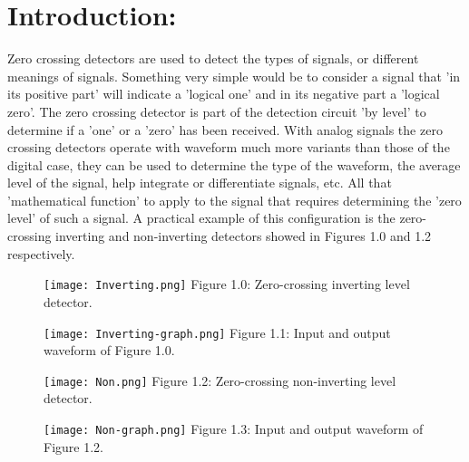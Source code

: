 \section{Introduction:}

Zero crossing detectors are used to detect the types of signals, or different meanings of signals. Something very simple would be to consider a signal that 'in its positive part' will indicate a 'logical one' and in its negative part a 'logical zero'. The zero crossing detector is part of the detection circuit 'by level' to determine if a 'one' or a 'zero' has been received. With analog signals the zero crossing detectors operate with waveform much more variants than those of the digital case, they can be used to determine the type of the waveform, the average level of the signal, help integrate or differentiate signals, etc. All that 'mathematical function' to apply to the signal that requires determining the 'zero level' of such a signal. A practical example of this configuration is the zero-crossing inverting and non-inverting detectors showed in Figures 1.0 and 1.2 respectively. \hfill \break

\begin{multicols}{2}
\begin{figure}[H]
\texttt{[image: Inverting.png]}
\centering \linebreak \linebreak Figure 1.0: Zero-crossing inverting level detector.
\end{figure} \hfill

\begin{figure}[H]
\texttt{[image: Inverting-graph.png]}
\centering \linebreak \linebreak Figure 1.1: Input and output waveform of Figure 1.0.
\end{figure} \hfill
\end{multicols} 

\begin{multicols}{2}
\begin{figure}[H]
\texttt{[image: Non.png]}
\centering \linebreak \linebreak Figure 1.2: Zero-crossing non-inverting level detector.
\end{figure} \hfill

\begin{figure}[H]
\texttt{[image: Non-graph.png]}
\centering \linebreak \linebreak Figure 1.3: Input and output waveform of Figure 1.2.
\end{figure} \hfill
\end{multicols} 

